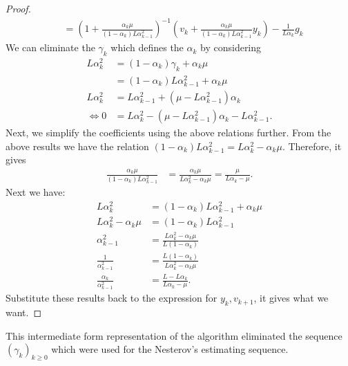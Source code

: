 \documentclass[12pt]{article}
\begin{document}
\begin{proof}
\begin{align*}
            &= 
            \left(
                1 + \frac{\alpha_k\mu}{(1 -\alpha_k)L\alpha_{k - 1}^2}
            \right)^{-1}
            \left(
                v_k + 
                \frac{\alpha_k\mu}{(1 - \alpha_k)L\alpha_{k - 1}^2} y_k
            \right)
            - \frac{1}{L\alpha_{k}} g_k
        \end{align*}
        We can eliminate the $\gamma_k$ which defines the $\alpha_k$ by considering 
        \begin{align*}
            L\alpha_k^2 &= 
            (1 - \alpha_k)\gamma_k + \alpha_k \mu 
            \\
            &= 
            (1 - \alpha_k)L\alpha_{k - 1}^2 
            + \alpha_k \mu
            \\
            L\alpha_k^2 &= 
            L \alpha_{k - 1}^2 + 
            (\mu - L \alpha_{k - 1}^2)\alpha_k
            \\
            \iff     
            0
            &=  
            L \alpha_k^2 - (\mu - L \alpha_{k - 1}^2)\alpha_k 
            - L \alpha_{k -1}^2. 
        \end{align*}
        Next, we simplify the coefficients using the above relations further. 
        From the above results we have the relation $(1 - \alpha_k)L\alpha_{k - 1}^2 = L \alpha_k^2 - \alpha_k \mu$. 
        Therefore,  it gives 
        \begin{align*}
            \frac{\alpha_k\mu}{(1 - \alpha_k)L \alpha_{k - 1}^2}
            &= 
            \frac{\alpha_k\mu}{L \alpha_k^2 - \alpha_k \mu}
            = \frac{\mu}{L \alpha_k - \mu}. 
        \end{align*}
        Next we have: 
        \begin{align*}
            L\alpha_k^2 &= 
            (1 - \alpha_k)L\alpha_{k - 1}^2 + \alpha_k \mu 
            \\
            L \alpha_k^2 - \alpha_k\mu &= 
            (1 - \alpha_k)L \alpha_{k - 1}^2
            \\
            \alpha_{k - 1}^2
            &= 
            \frac{L \alpha_k^2 - \alpha_k\mu}{L (1 - \alpha_k)}
            \\
            \frac{1}{\alpha_{k - 1}^2}
            &= 
            \frac{L (1 - \alpha_k)}{L \alpha_k^2 - \alpha_k\mu}
            \\
            \frac{\alpha_k}{\alpha_{k - 1}^2}
            &= 
            \frac{L - L\alpha_k}{L\alpha_k - \mu}. 
        \end{align*}
        Substitute these results back to the expression for $y_k, v_{k + 1}$, it gives what we want. 

    \end{proof}
    \begin{remark}
        This intermediate form representation of the algorithm eliminated the sequence $(\gamma_k)_{k \ge0}$ which were used for the Nesterov's estimating sequence. 
    \end{remark}
\end{document}
